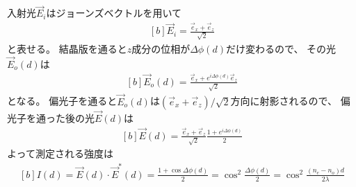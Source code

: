\documentclass[../../master.tex]{subfiles}
\begin{document}
\section{}
入射光\(\vec{E}_{i}\)はジョーンズベクトルを用いて
\begin{equation}\begin{aligned}[b]
    \vec{E}_{i} = \frac{\vec{e}_x+\vec{e}_z}{\sqrt{2}}
\end{aligned}\end{equation}
と表せる。
結晶版を通ると\(z\)成分の位相が\(\Delta\phi(d)\)だけ変わるので、
その光\(\vec{E}_o(d)\)は
\begin{equation}\begin{aligned}[b]
    \vec{E}_{o}(d) = \frac{\vec{e}_x+e^{i\Delta\phi(d)}\vec{e}_z}{\sqrt{2}}
\end{aligned}\end{equation}
となる。
偏光子を通ると\(\vec{E}_o(d)\)は\((\vec{e}_x+\vec{e}_z)/\sqrt{2}\)方向に射影されるので、
偏光子を通った後の光\(\vec{E}(d)\)は
\begin{equation}\begin{aligned}[b]
    \vec{E}(d) = \frac{\vec{e}_x+\vec{e}_z}{\sqrt{2}}\frac{1+e^{i\Delta\phi(d)}}{2}
\end{aligned}\end{equation}
よって測定される強度は
\begin{equation}\begin{aligned}[b]
    I(d) = \vec{E}(d)\cdot\vec{E}^*(d) = \frac{1+\cos\Delta\phi(d)}{2}
    =\cos^2\frac{\Delta\phi(d)}{2} = \cos^2 \frac{(n_e-n_o)d}{2\lambda}
\end{aligned}\end{equation}
\end{document}
